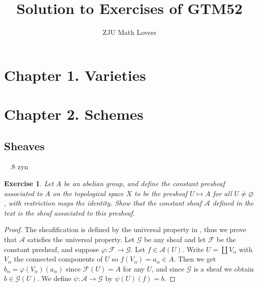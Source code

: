 \documentclass[12pt]{amsart}
\title{Solution to Exercises of GTM52}
\date{}
\author{ZJU Math Lovers}
\newtheorem{exe}{Exercise}[subsection]
\begin{document}
\maketitle
\tableofcontents
\section{Chapter 1.  Varieties}
\section{Chapter 2.  Schemes}

\subsection{Sheaves}
\ \newline
{}.8 zyn
\begin{exe}
Let $A$ be an abelian group, and define the constant presheaf associated to $A$ on the topological space $X$ to be the presheaf $U \mapsto A$ for all $U \neq \varnothing$, with restriction maps the identity. Show that the constant sheaf $\mathscr{A}$ defined in the text is the sheaf associated to this presheaf.
\end{exe}  
\begin{proof}
The sheafification is defined by the universal property in \cite{HAR},  thus we prove that $\mathscr{A}$ satisfies the universal property.  Let $\mathscr{G}$ be any sheaf and let $\mathscr{F}$ be the constant presheaf, and suppose $\varphi: \mathscr{F} \rightarrow \mathscr{G}$.  Let $f \in \mathscr{A}(U)$.  Write $U=\coprod V_{\alpha}$ with $V_{\alpha}$ the connected components of $U$ so $f(V_{\alpha})=a_{\alpha} \in A .$ Then we get $b_{\alpha}=\varphi(V_{\alpha})(a_{\alpha})$ since $\mathscr{F}(U)=A$ for any $U$,  and since $\mathscr{G}$ is a sheaf we obtain $b \in \mathscr{G}(U)$.  We define $\psi: \mathscr{A} \rightarrow \mathscr{G}$ by $\psi(U)(f)=b$.
\end{proof}
\end{document}
